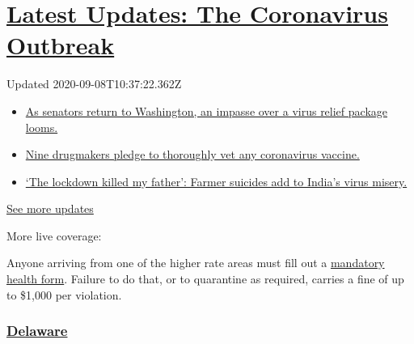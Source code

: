 \hypertarget{latest-updates-the-coronavirus-outbreak}{%
\section{\texorpdfstring{\href{https://www.nytimes3xbfgragh.onion/2020/09/08/world/covid-19-coronavirus.html?action=click\&pgtype=Article\&state=default\&region=MAIN_CONTENT_1\&context=storylines_live_updates}{Latest
Updates: The Coronavirus
Outbreak}}{Latest Updates: The Coronavirus Outbreak}}\label{latest-updates-the-coronavirus-outbreak}}

Updated 2020-09-08T10:37:22.362Z

\begin{itemize}
\tightlist
\item
  \href{https://www.nytimes3xbfgragh.onion/2020/09/08/world/covid-19-coronavirus.html?action=click\&pgtype=Article\&state=default\&region=MAIN_CONTENT_1\&context=storylines_live_updates\#link-4a77847f}{As
  senators return to Washington, an impasse over a virus relief package
  looms.}
\item
  \href{https://www.nytimes3xbfgragh.onion/2020/09/08/world/covid-19-coronavirus.html?action=click\&pgtype=Article\&state=default\&region=MAIN_CONTENT_1\&context=storylines_live_updates\#link-679303d7}{Nine
  drugmakers pledge to thoroughly vet any coronavirus vaccine.}
\item
  \href{https://www.nytimes3xbfgragh.onion/2020/09/08/world/covid-19-coronavirus.html?action=click\&pgtype=Article\&state=default\&region=MAIN_CONTENT_1\&context=storylines_live_updates\#link-1c973131}{`The
  lockdown killed my father': Farmer suicides add to India's virus
  misery.}
\end{itemize}

\href{https://www.nytimes3xbfgragh.onion/2020/09/08/world/covid-19-coronavirus.html?action=click\&pgtype=Article\&state=default\&region=MAIN_CONTENT_1\&context=storylines_live_updates}{See
more updates}

More live coverage:

Anyone arriving from one of the higher rate areas must fill out a
\href{https://appengine.egov.com/apps/ct/DPH/Connecticut-Travel-Health-Form}{mandatory
health form}. Failure to do that, or to quarantine as required, carries
a fine of up to \$1,000 per violation.

\hypertarget{delaware}{%
\subsubsection{\texorpdfstring{\href{https://www.visitdelaware.com/industry/covid-19-in-delaware/}{Delaware}}{Delaware}}\label{delaware}}

